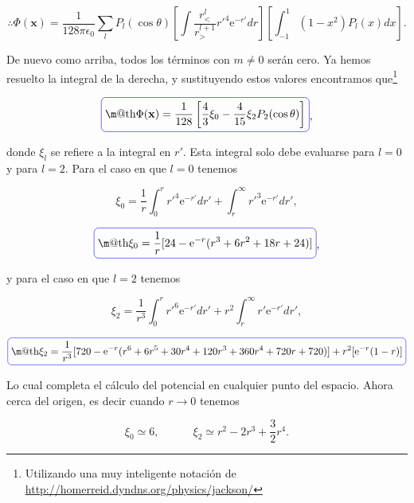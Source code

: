 \documentclass[a4paper,11pt]{article}
\makeatletter
\numberwithin{equation}{section}
\newcommand*{\boxcolor}{blue}
\renewcommand{\boxed}[1]{\textcolor{\boxcolor}{%
\tikz[baseline={([yshift=-1ex]current bounding box.center)}] \node [rectangle, minimum width=1ex,rounded corners,draw] {\normalcolor\m@th$\displaystyle#1$};}}
\newcommand{\euler}{\mathrm{e}}
\makeatother
\begin{document}
\begin{equation}
 \therefore \Phi(\mathbf{x}) = \frac{1}{128\pi \epsilon_0 }\sum_l P_l(\cos{\theta})
 \left[\int \frac{r^l_{<}}{r^{l+1}_{>}}r'^4\euler^{-r'} dr\right]
 \left[\int_{-1}^1 (1-x^2)P_l(x)dx\right].
\end{equation}

De nuevo como arriba, todos los términos con $m \neq 0$ serán cero. Ya hemos resuelto 
la integral de la derecha, y sustituyendo estos valores encontramos que\footnote{Utilizando 
una muy inteligente notación de \href{http://homerreid.dyndns.org/physics/jackson/}{http://homerreid.dyndns.org/physics/jackson/}}

\begin{equation}
 \boxed{\Phi(\mathbf{x}) = \frac{1}{128}\left[\frac{4}{3}\xi_0 - \frac{4}{15}\xi_2 
 P_2(\cos{\theta})\right]},
\end{equation}

donde $\xi_l$ se refiere a la integral en $r'$. Esta integral solo debe evaluarse 
para $l=0$ y para $l=2$. Para el caso en que $l=0$ tenemos 

\begin{equation}
 \xi_0 = \frac{1}{r}\int_0^r r'^4 \euler^{-r'} dr' + \int_r^\infty r'^3\euler^{-r'} dr',
\end{equation}

\begin{equation}
 \boxed{\xi_0 = \frac{1}{r}[24 - \euler^{-r}(r^3 + 6r^2 + 18r + 24)]},
\end{equation}

y para el caso en que $l=2$ tenemos 

\begin{equation}
  \xi_2 = \frac{1}{r^3}\int_0^r r'^6 \euler^{-r'} dr' + r^2 \int_r^\infty r'\euler^{-r'} dr',
\end{equation}

\begin{equation*}
 \boxed{\xi_2 = \frac{1}{r^3}[720 - \euler^{-r}(r^6 + 6r^5 + 30r^4 + 120r^3 + 360r^4 + 
 720r + 720)] + r^2[\euler^{-r}(1-r)]}
\end{equation*}

Lo cual completa el cálculo del potencial en cualquier punto del espacio. Ahora cerca 
del origen, es decir cuando $r \rightarrow 0$ tenemos 

\begin{equation}
 \xi_0 \simeq 6, \qquad \quad \xi_2 \simeq r^2 - 2r^3 + \frac{3}{2}r^4.
\end{equation}
\end{document}
